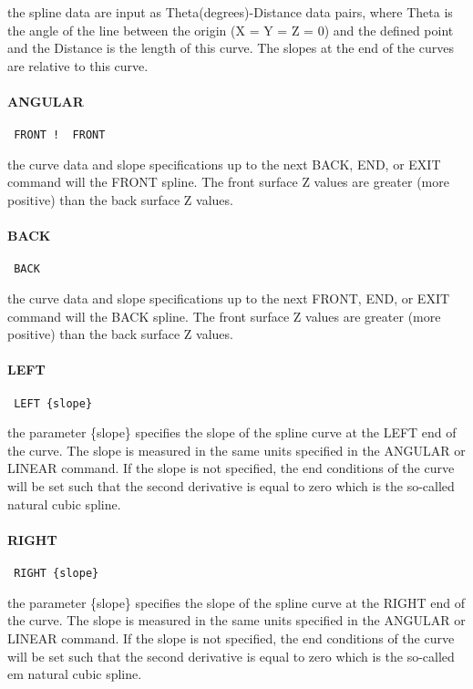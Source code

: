 the spline data are input as Theta(degrees)-Distance data pairs, where
Theta is the angle of the line between the origin (X = Y = Z = 0) and
the defined point and the Distance is the length of this curve.  The
slopes at the end of the curves are relative to this curve.  
\paragraph{ANGULAR}
\begin{verbatim}
 FRONT !  FRONT
\end{verbatim}

the curve data and slope specifications up to the next BACK, END, or
EXIT command will  the FRONT spline.  The front surface Z
values are greater (more positive) than the back surface Z values.
\paragraph{BACK}
\begin{verbatim}
 BACK
\end{verbatim}

the curve data and slope specifications up to the next FRONT, END, or
EXIT command will  the BACK spline.  The front surface Z
values are greater (more positive) than the back surface Z values.
\paragraph{LEFT}
\begin{verbatim}
 LEFT {slope}
\end{verbatim}

the parameter \{slope\} specifies the slope of the spline curve at the
LEFT end of the curve.  The slope is measured in the same units
specified in the ANGULAR or LINEAR command.  If the slope is not
specified, the end conditions of the curve will be set such that the
second derivative is equal to zero which is the so-called natural
cubic spline.
\paragraph{RIGHT}
\begin{verbatim}
 RIGHT {slope}
\end{verbatim}

the parameter \{slope\} specifies the slope of the spline curve at the
RIGHT end of the curve.  The slope is measured in the same units
specified in the ANGULAR or LINEAR command.  If the slope is not
specified, the end conditions of the curve will be set such that the
second derivative is equal to zero which is the so-called em natural
cubic spline.
